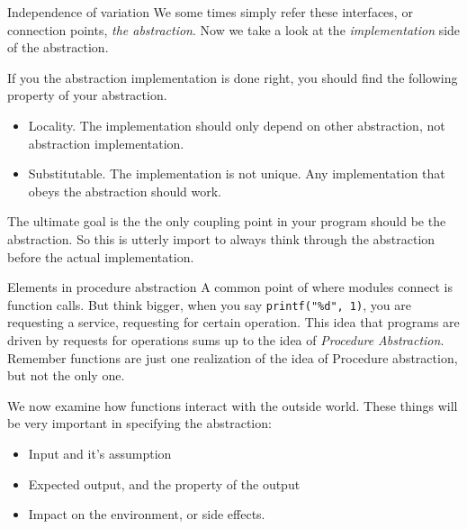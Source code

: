 \begin{frame}{Independence of variation}
We some times simply refer these interfaces, or connection points, \textit{the abstraction}. Now we take a look at the \textit{implementation} side of the abstraction.

If you the abstraction implementation is done right, you should find the following property of your abstraction.

\begin{itemize}
	\item Locality. The implementation should only depend on other abstraction, not abstraction implementation.
	\item Substitutable. The implementation is not unique. Any implementation that obeys the abstraction should work.
\end{itemize}

The ultimate goal is the the only coupling point in your program should be the abstraction. \alert{So this is utterly import to always think through the abstraction before the actual implementation.}
\end{frame}

\begin{frame}{Elements in procedure abstraction}
A common point of where modules connect is function calls. But think bigger, when you say \texttt{printf("\%d", 1)}, you are requesting a service, requesting for certain operation. This idea that programs are driven by requests for operations sums up to the idea of \textit{Procedure Abstraction}. Remember functions are just one realization of the idea of Procedure abstraction, but not the only one.

We now examine how functions interact with the outside world. These things will be very important in specifying the abstraction:

\begin{itemize}
	\item Input and it's assumption
	\item Expected output, and the property of the output
	\item Impact on the environment, or side effects.
\end{itemize}
\end{frame}


